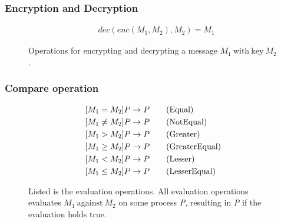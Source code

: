 \subsubsection{Encryption and Decryption}
\begin{figure}[h]
\begin{align*}
    &dec(enc(M_1, M_2),M_2) = M_1 \tag{Decrypt}
\end{align*}
\caption{Operations for encrypting and decrypting a message $M_1\ \mathrm{with\ key}\ M_2$.}
\end{figure}
\FloatBarrier

\subsubsection{Compare operation}
\begin{figure}[h]
\begin{align}
    &[M_1 = M_2]P \rightarrow P \tag{Equal}\\
    &[M_1 \neq M_2]P \rightarrow P \tag{NotEqual}\\
    &[M_1 > M_2]P \rightarrow P \tag{Greater}\\
    &[M_1 \geq M_2]P \rightarrow P \tag{GreaterEqual}\\
    &[M_1 < M_2]P \rightarrow P \tag{Lesser}\\
    &[M_1 \leq M_2]P \rightarrow P \tag{LesserEqual}
\end{align}
\caption{Listed is the evaluation operations. All evaluation operations evaluates $M_1\ \mathrm{against}\ M_2$ on some process \textit{P}, resulting in \textit{P} if the evaluation holds true.}
\end{figure}


